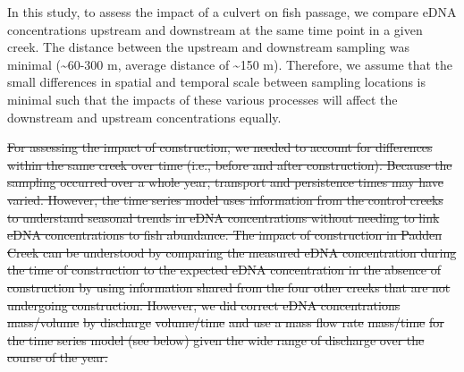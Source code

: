 \documentclass[
]{article}
\providecommand{\DIFdeltex}[1]{{\protect\color{red}\sout{#1}}}                      %
\providecommand{\DIFdelbegin}{} %
\providecommand{\DIFdel}[1]{\texorpdfstring{\DIFdeltex{#1}}{}} %
\newcommand{\DIFscaledelfig}{0.5}
\newlength{\DIFdelgraphicswidth} %
\newlength{\DIFdelgraphicsheight} %
\newcommand{\DIFdelincludegraphics}[2][]{%
\sbox{\DIFdelgraphicsbox}{\DIFOincludegraphics[#1]{#2}}%
\settoboxwidth{\DIFdelgraphicswidth}{\DIFdelgraphicsbox} %
\settoboxtotalheight{\DIFdelgraphicsheight}{\DIFdelgraphicsbox} %
\scalebox{\DIFscaledelfig}{%
\parbox[b]{\DIFdelgraphicswidth}{\usebox{\DIFdelgraphicsbox}\\[-\baselineskip] \rule{\DIFdelgraphicswidth}{0em}}\llap{\resizebox{\DIFdelgraphicswidth}{\DIFdelgraphicsheight}{%
\setlength{\unitlength}{\DIFdelgraphicswidth}%
\begin{picture}(1,1)%
\thicklines\linethickness{2pt} %
{\color[rgb]{1,0,0}\put(0,0){\framebox(1,1){}}}%
{\color[rgb]{1,0,0}\put(0,0){\line( 1,1){1}}}%
{\color[rgb]{1,0,0}\put(0,1){\line(1,-1){1}}}%
\end{picture}%
}\hspace*{3pt}}} %
} %
\DeclareRobustCommand{\DIFdelbegin}{\DIFOdelbegin \let\includegraphics\DIFdelincludegraphics} %
\begin{document}
In this study, to assess the impact of a culvert on fish passage, we
compare eDNA concentrations upstream and downstream at the same time
point in a given creek. The distance between the upstream and downstream
sampling was minimal (\textasciitilde60-300 m, average distance of
\textasciitilde150 m). Therefore, we assume that the small differences
in spatial and temporal scale between sampling locations is minimal such
that the impacts of these various processes will affect the downstream
and upstream concentrations equally. \DIFdelbegin %

\DIFdel{For assessing the impact of construction, we needed to account for
differences within the same creek over time (i.e., before and after
construction). Because the sampling occurred over a whole year,
transport and persistence times may have varied. However, the time
series model uses information from the control creeks to understand
seasonal trends in eDNA concentrations without needing to link eDNA
concentrations to fish abundance. The impact of construction in Padden
Creek can be understood by comparing the measured eDNA concentration
during the time of construction to the expected eDNA concentration in
the absence of construction by using information shared from the four
other creeks that are not undergoing construction. However, we did
correct eDNA concentrations }%
\DIFdel{mass/volume}%
\DIFdel{by discharge
}%
\DIFdel{volume/time}%
\DIFdel{and use a mass flow rate }%
\DIFdel{mass/time}%
\DIFdel{for the time
series model (see below) given the wide range of discharge over the
course of the year.
}%

\end{document}
